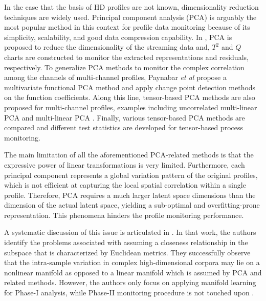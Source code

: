 \documentclass{scrartcl}
\theoremstyle{definition}
\begin{document}
In the case that the basis of HD profiles are not known, dimensionality reduction techniques are widely used. Principal component analysis (PCA) is arguably the most popular method in this context for profile data monitoring because of its simplicity, scalability, and good data compression capability. 
In \parencite{liu1995control}, PCA is proposed to reduce the dimensionality of the streaming data and, $T^{2}$ and $Q$ charts are constructed to monitor the extracted representations and residuals, respectively. 
To generalize PCA methods to monitor the complex correlation among the channels of multi-channel profiles, Paynabar \textit{et al} \parencite{paynabar2015change} propose a multivariate functional PCA method and apply change point detection methods on the function coefficients.
Along this line, tensor-based PCA methods are also proposed for multi-channel profiles, examples including uncorrelated multi-linear PCA \parencite{paynabar2013monitoring} and multi-linear PCA \parencite{grasso2014profile}. 
Finally, various tensor-based PCA methods \parencite{yan2015image} are compared and different test statistics are developed for tensor-based process monitoring.

The main limitation of all the aforementioned PCA-related methods is that the expressive power of linear transformations is very limited. Furthermore, each principal component represents a global variation pattern of the original profiles, which is not efficient at capturing the local spatial correlation within a single profile. Therefore, PCA requires a much larger latent space dimensions than the dimension of the actual latent space, yielding a sub-optimal and overfitting-prone representation. This phenomena hinders the profile monitoring performance. 

A systematic discussion of this issue is articulated in \parencite{Shi2016-tg}. 
In that work, the authors identify the problems associated with assuming a closeness relationship in the subspace that is characterized by Euclidean metrics.
They successfully observe that the intra-sample variation in complex high-dimensional corpora may lie on a nonlinear manifold as opposed to a linear manifold which is assumed by PCA and related methods. However, the authors only focus on applying manifold learning for Phase-I analysis, while Phase-II monitoring procedure is not touched upon \parencite{Shi2016-tg}.
\end{document}
